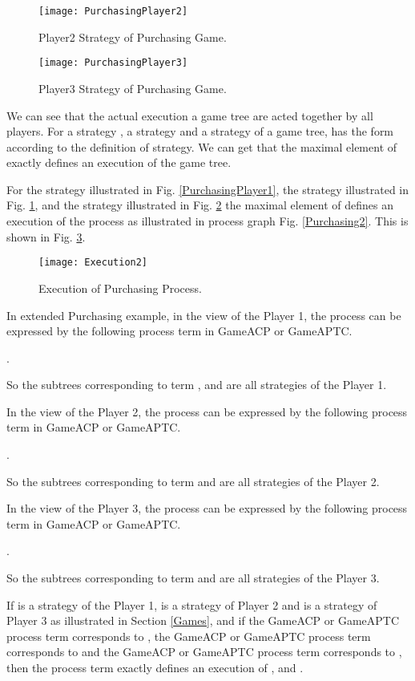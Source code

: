 \documentclass{fac}
\begin{document}
\begin{figure}
  \centering
\texttt{[image: PurchasingPlayer2]}
  \caption{Player2 Strategy of Purchasing Game.}
  \label{PurchasingPlayer2}
\end{figure}

\begin{figure}
  \centering
\texttt{[image: PurchasingPlayer3]}
  \caption{Player3 Strategy of Purchasing Game.}
  \label{PurchasingPlayer3}
\end{figure}

We can see that the actual execution a game tree are acted together by all players. For a strategy , a strategy  and a strategy  of a game tree,  has the form  according to the definition of strategy. We can get that the maximal element  of  exactly defines an execution of the game tree.

For the strategy  illustrated in Fig. \ref{PurchasingPlayer1}, the strategy  illustrated in Fig. \ref{PurchasingPlayer2}, and the strategy  illustrated in Fig. \ref{PurchasingPlayer3} the maximal element  of  defines an execution of the process as illustrated in process graph Fig. \ref{Purchasing2}. This is shown in Fig. \ref{Execution2}.

\begin{figure}
  \centering
\texttt{[image: Execution2]}
  \caption{Execution of Purchasing Process.}
  \label{Execution2}
\end{figure}

In extended Purchasing example, in the view of the Player 1, the process can be expressed by the following process term in GameACP or GameAPTC.

.

So the subtrees corresponding to term ,  and  are all strategies of the Player 1.

In the view of the Player 2, the process can be expressed by the following process term in GameACP or GameAPTC.

.

So the subtrees corresponding to term  and  are all strategies of the Player 2.

In the view of the Player 3, the process can be expressed by the following process term in GameACP or GameAPTC.

.

So the subtrees corresponding to term  and  are all strategies of the Player 3.

If  is a strategy of the Player 1,  is a strategy of Player 2 and  is a strategy of Player 3 as illustrated in Section \ref{Games}, and if the GameACP or GameAPTC process term  corresponds to , the GameACP or GameAPTC process term  corresponds to  and the GameACP or GameAPTC process term  corresponds to , then the process term  exactly defines an execution of ,  and .
\end{document}
